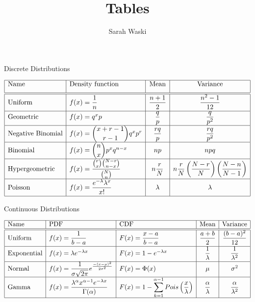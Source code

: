 \documentclass[11pt]{article}
\title{Tables}
\author{Sarah Waski}
\date{}
\begin{document}
\begin{table}[ht]
\renewcommand{\arraystretch}{2.5}
\caption{Discrete Distributions}
\[
\begin{array}[h]{| l | l  | c | c | }
\hline
\text{Name} & \text{Density function} & \text{Mean} & \text{Variance}\\[\medskipamount] 
\hline \hline
\text{Uniform} & f(x)=\dfrac{1}{n} & \dfrac{n+1}{2} & \dfrac{n^2 - 1}{12} \\[\medskipamount]  \hline
\text{Geometric} & f(x)=q^x p & \dfrac{q}{p} & \dfrac{q}{p^2} \\[\medskipamount]  \hline
\text{Negative Binomial} & f(x)=\dbinom{x+r-1}{r-1} q^x p^r &  \dfrac{rq}{p} & \dfrac{rq}{p^2}  \\[\medskipamount] \hline
\text{Binomial} & f(x)=\dbinom{n}{x}p^x q^{n-x} &  np & npq \\[\medskipamount] \hline
\text{Hypergeometric} &  f(x)=\dfrac{\binom{r}{x} \binom{N-r}{n-x}}{\binom{N}{n}} & n \dfrac{r}{N} & n \dfrac{r}{N}\left(\dfrac{N-r}{N}\right)\left(\dfrac{N-n}{N-1}\right) \\[\medskipamount] \hline
\text{Poisson} & f(x)=\dfrac{e^{-\lambda} \lambda^x}{x!} &  \lambda & \lambda  \\[\medskipamount]  \hline
\end{array}
\]
\label{table:DD}
\end{table}%

\begin{table}[!h]
\renewcommand{\arraystretch}{2.5}
\caption{Continuous Distributions}
\[
\begin{array}[h]{| l | l | l | c | c |}
\hline
\text{Name} & \text{PDF} & \text{CDF}& \text{Mean} & \text{Variance}\\ \hline \hline
\text{Uniform} & f(x)=\dfrac{1}{b-a} & F(x)=\dfrac{x-a}{b-a} & \dfrac{a+b}{2} & \dfrac{(b-a)^2}{12} \\[\medskipamount]  \hline
\text{Exponential} & f(x)=\lambda e ^{-\lambda x} & F(x)= 1-e ^{-\lambda x} & \dfrac{1}{\lambda} & \dfrac{1}{\lambda^2}  \\[\medskipamount]  \hline
\text{Normal} & f(x)=\dfrac{1}{\sigma\sqrt{2\pi}} e^{\frac{-(x-\mu)^2}{2\sigma^2}}& F(x)=\Phi(x)  & \mu & \sigma^2  \\[\medskipamount]  \hline
\text{Gamma} & f(x)=\dfrac{\lambda^\alpha x^{\alpha-1}{e^{-\lambda x}}}{\Gamma(\alpha)} & F(x)= 1-\displaystyle\sum_{k=1}^{\alpha-1} Pois\left(\frac{x}{\lambda}\right)  & \dfrac{\alpha}{\lambda} & \dfrac{\alpha}{\lambda^2}  \\[\medskipamount]  \hline
\end{array}
\]
\label{table:CD}
\end{table}%
\end{document}
